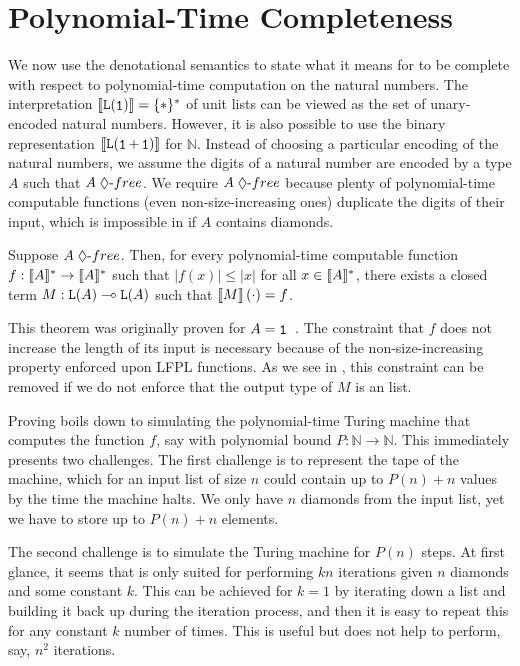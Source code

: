 \section{Polynomial-Time Completeness}
\label{sec:completeness}

We now use the denotational semantics to state what it means for \lfpl to be complete with respect to polynomial-time computation on the natural numbers. The interpretation $\tpsem{\tplist{\tpunit}} = \{\ast\}^*$ of unit lists can be viewed as the set of unary-encoded natural numbers. However, it is also possible to use the binary representation $\tpsem{\tplist{\tpsum{\tpunit}{\tpunit}}}$ for $\mathbb N$.
%
Instead of choosing a particular encoding of the natural numbers, we
assume the digits of a natural number are encoded by a type $A$ such that
$\dfree{A}$. We require $\dfree{A}$ because plenty of polynomial-time
computable functions (even non-size-increasing ones) duplicate the
digits of their input, which is impossible in \lfpl if $A$ contains
diamonds.

\begin{theorem}
\label{thm:completeness-concrete}
Suppose $\dfree{A}$. Then, for every polynomial-time computable function $f : \llbracket A \rrbracket^* \to \llbracket A \rrbracket^*$ such that $|f(x)| \le |x|$ for all $x \in \llbracket A \rrbracket^*$, there exists a closed term $M : \tparr{\tplist{A}}{\tplist{A}}$ such that ${\llbracket M \rrbracket}\left(\cdot\right) = f$.
\end{theorem}

This theorem was originally proven for $A = \tpunit$~\cite{hofmannStrengthNonsizeIncreasing2002}. The constraint that $f$ does not increase the length of its input is necessary because of the non-size-increasing property enforced upon LFPL functions. As we see in , this constraint can be removed if we do not enforce that the output type of $M$ is an \lfpl list.

Proving  boils down to simulating the polynomial-time Turing machine that computes the function $f$, say with polynomial bound $P : \mathbb N \to \mathbb N$. This immediately presents two challenges. The first challenge is to represent the tape of the machine, which for an input list of size $n$ could contain up to $P(n) + n$ values by the time the machine halts. We only have $n$ diamonds from the input list, yet we have to store up to $P(n) + n$ elements.

The second challenge is to simulate the Turing machine for $P(n)$ steps. At first glance, it seems that \lfpl is only suited for performing $kn$ iterations given $n$ diamonds and some constant $k$. This can be achieved for $k = 1$ by iterating down a list and building it back up during the iteration process, and then it is easy to repeat this for any constant $k$ number of times. This is useful but does not help to perform, say, $n^2$ iterations.

